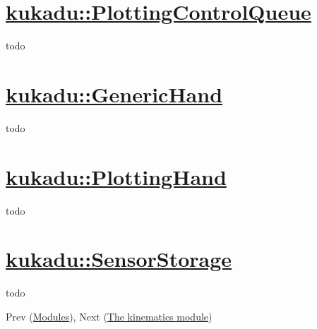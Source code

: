 \section*{\hyperlink{classkukadu_1_1PlottingControlQueue}{kukadu\-::\-Plotting\-Control\-Queue}}

todo

\section*{\hyperlink{classkukadu_1_1GenericHand}{kukadu\-::\-Generic\-Hand}}

todo

\section*{\hyperlink{classkukadu_1_1PlottingHand}{kukadu\-::\-Plotting\-Hand}}

todo

\section*{\hyperlink{classkukadu_1_1SensorStorage}{kukadu\-::\-Sensor\-Storage}}

todo

Prev (\hyperlink{modulespage}{Modules}), Next (\hyperlink{kinematicspage}{The kinematics module}) 